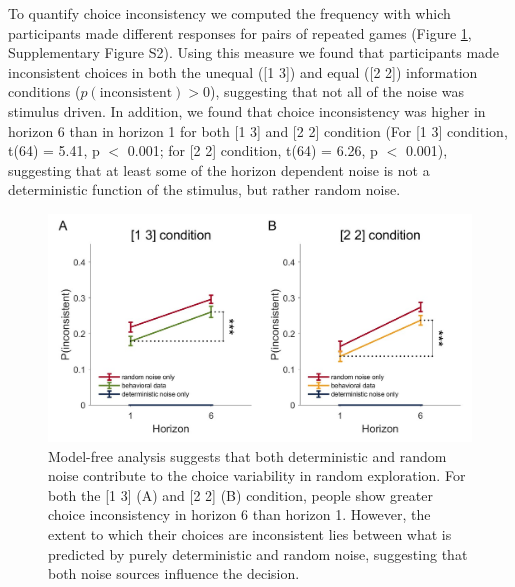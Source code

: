\documentclass[12pt]{article}
\begin{document}
{To quantify choice inconsistency we computed the frequency with which participants made different responses for pairs of repeated games (Figure \ref{fig:mf2}, Supplementary Figure S2). Using this measure we found that participants made inconsistent choices in both the unequal ([1 3]) and equal ([2 2]) information conditions ($p(\mbox{inconsistent}) > 0 $), suggesting that not all of the noise was stimulus driven. In addition, we found that choice inconsistency was higher in horizon 6 than in horizon 1 for both [1 3] and [2 2] condition (For [1 3] condition, t(64) = 5.41, p $<$ 0.001; for [2 2] condition, t(64) = 6.26, p $<$ 0.001), suggesting that at least some of the horizon dependent noise is not a deterministic function of the stimulus, but rather random noise.


\begin{figure}[H]
	\begin{center}
		\includegraphics[width=\textwidth]{figures/RanDetNoise_pinconsistent.jpg}
		\caption{Model-free analysis suggests that both deterministic and random noise contribute to the choice variability in random exploration. For both the [1 3] (A) and [2 2] (B) condition, people show greater choice inconsistency in horizon 6 than horizon 1. However, the extent to which their choices are inconsistent lies between what is predicted by purely deterministic and random noise, suggesting that both noise sources influence the decision.}
		\label{fig:mf2}
	\end{center}
\end{figure}

}
\end{document}
